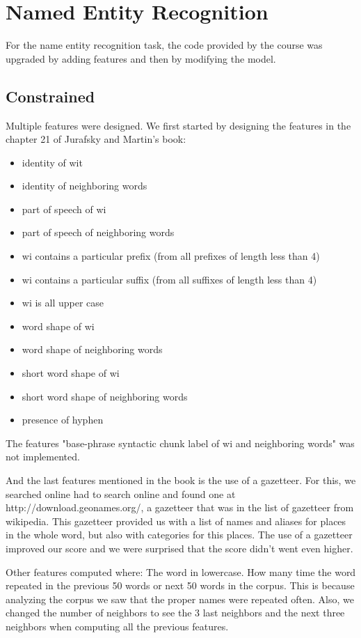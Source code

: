 \documentclass{article}
\begin{document}
\section{Named Entity Recognition}

For the name entity recognition task, the code provided by the course was upgraded by adding features and then by modifying the model.

\subsection{Constrained}

Multiple features were designed. We first started by designing the features in the chapter 21 of Jurafsky and Martin’s book:
\begin{itemize}  
	\item identity of wit
	\item identity of neighboring words
	\item part of speech of wi
	\item part of speech of neighboring words
	\item wi contains a particular prefix (from all prefixes of length less than 4)
	\item wi contains a particular suffix (from all suffixes of length less than 4)
	\item wi is all upper case
	\item word shape of wi
	\item word shape of neighboring words
	\item short word shape of wi
	\item short word shape of neighboring words
	\item presence of hyphen 
\end{itemize}

The features "base-phrase syntactic chunk label of wi and neighboring words" was not implemented.

And the last features mentioned in the book is the use of a gazetteer. For this, we searched online had to search online and found one at http://download.geonames.org/, a gazetteer that was in the list of gazetteer from wikipedia. This gazetteer provided us with a list of names and aliases for places in the whole word, but also with categories for this places. The use of a gazetteer improved our score and we were surprised that the score didn't went even higher. 

Other features computed where:
The word in lowercase. 
How many time the word repeated in the previous 50 words or next 50 words in the corpus. This is because analyzing the corpus we saw that the proper names were repeated often.
Also, we changed the number of neighbors to see the 3 last neighbors and the next three neighbors when computing all the previous features.
\end{document}
